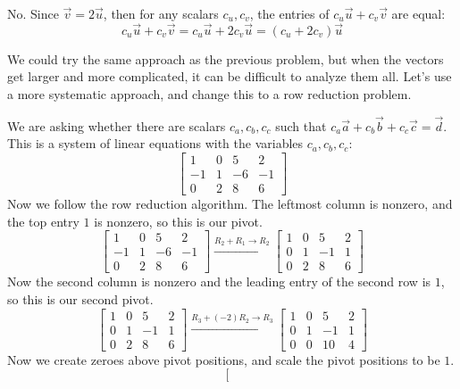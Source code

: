 \documentclass[12pt,letterpaper]{article}
\begin{document}
\begin{enumerate}
  \Answer
  No. Since $\vec{v}=2\vec{u}$, then for any scalars $c_u,c_v$, the entries of $c_u\vec{u}+c_v\vec{v}$ are equal:
  \[c_u\vec{u}+c_v\vec{v}=c_u\vec{u}+2c_v\vec{u}=(c_u+2c_v)\vec{u}\]

  \Answer
  We could try the same approach as the previous problem, but when the vectors get larger and more complicated, it can be difficult to analyze them all. Let's use a more systematic approach, and change this to a row reduction problem.

  We are asking whether there are scalars $c_a,c_b,c_c$ such that $c_a\vec{a}+c_b\vec{b}+c_c\vec{c}=\vec{d}$. This is a system of linear equations with the variables $c_a,c_b,c_c$:
  \[
    \left[
      \begin{array}{ccc|c}
        1&0&5&2\\
        -1&1&-6&-1\\
        0&2&8&6
      \end{array}
    \right]
  \]
  Now we follow the row reduction algorithm. The leftmost column is nonzero, and the top entry $1$ is nonzero, so this is our pivot. 
  \[
    \left[
      \begin{array}{ccc|c}
        1&0&5&2\\
        -1&1&-6&-1\\
        0&2&8&6
      \end{array}
    \right]\xrightarrow{R_2+R_1\rightarrow R_2}
    \left[
      \begin{array}{ccc|c}
        1&0&5&2\\
        0&1&-1&1\\
        0&2&8&6
      \end{array}
    \right]
  \]
  Now the second column is nonzero and the leading entry of the second row is $1$, so this is our second pivot.
  \[
    \left[
      \begin{array}{ccc|c}
        1&0&5&2\\
        0&1&-1&1\\
        0&2&8&6
      \end{array}
    \right]\xrightarrow{R_3+(-2)R_2\rightarrow R_3}
    \left[
      \begin{array}{ccc|c}
        1&0&5&2\\
        0&1&-1&1\\
        0&0&10&4
      \end{array}
    \right]
  \]
  Now we create zeroes above pivot positions, and scale the pivot positions to be $1$.
  \[
    \left[
      \begin{array}{ccc|c}

\end{array}\]
\end{enumerate}
\end{document}
